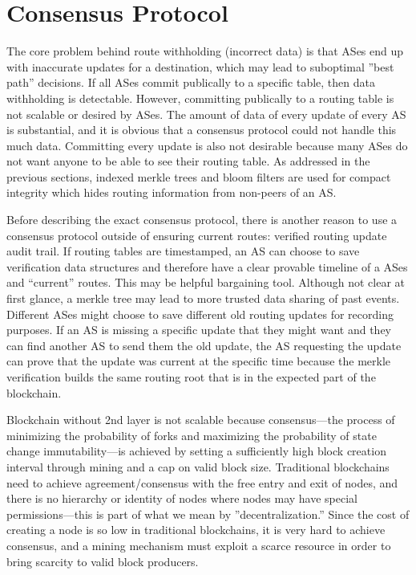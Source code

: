 \documentclass[letterpaper, 10 pt, conference]{ieeeconf}  %
\begin{document}
\section{Consensus Protocol}

The core problem behind route withholding (incorrect data) is that ASes end up with inaccurate updates for a destination, which may lead to suboptimal ”best path” decisions. If all ASes commit publically to a specific table, then data withholding is detectable. However, committing publically to a routing table is not scalable or desired by ASes. The amount of data of every update of every AS is substantial, and it is obvious that a consensus protocol could not handle this much data. Committing every update is also not desirable because many ASes do not want anyone to be able to see their routing table. As addressed in the previous sections, indexed merkle trees and bloom filters are used for compact integrity which hides routing information from non-peers of an AS.

Before describing the exact consensus protocol, there is another reason to use a consensus protocol outside of ensuring current routes: verified routing update audit trail. If routing tables are timestamped, an AS can choose to save verification data structures and therefore have a clear provable timeline of a ASes and “current” routes. This may be helpful bargaining tool. Although not clear at first glance, a merkle tree may lead to more trusted data sharing of past events. Different ASes might choose to save different old routing updates for recording purposes. If an AS is missing a specific update that they might want and they can find another AS to send them the old update, the AS requesting the update can prove that the update was current at the specific time because the merkle verification builds the same routing root that is in the expected part of the blockchain. 

Blockchain without 2nd layer is not scalable because consensus---the process of minimizing the probability of forks and maximizing the probability of state change immutability---is achieved by setting a sufficiently high block creation interval through mining and a cap on valid block size. Traditional blockchains need to achieve agreement/consensus with the free entry and exit of nodes, and there is no hierarchy or identity of nodes where nodes may have special permissions---this is part of what we mean by ”decentralization.” Since the cost of creating a node is so low in traditional blockchains, it is very hard to achieve consensus, and a mining mechanism must exploit a scarce resource in order to bring scarcity to valid block producers. 
\end{document}
